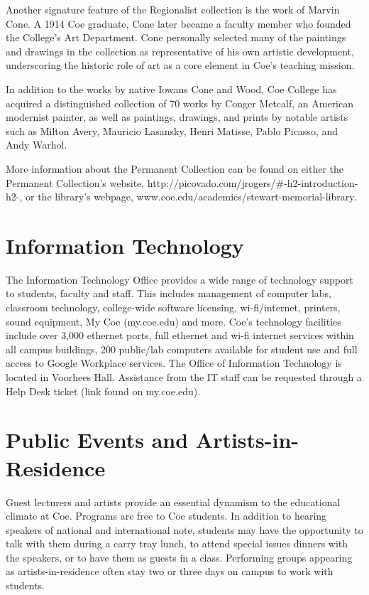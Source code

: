 \documentclass[
  letterpaper,
]{scrbook}
\begin{document}
Another signature feature of the Regionalist collection is the work of
Marvin Cone. A 1914 Coe graduate, Cone later became a faculty member who
founded the College's Art Department. Cone personally selected many of
the paintings and drawings in the collection as representative of his
own artistic development, underscoring the historic role of art as a
core element in Coe's teaching mission.

In addition to the works by native Iowans Cone and Wood, Coe College has
acquired a distinguished collection of 70 works by Conger Metcalf, an
American modernist painter, as well as paintings, drawings, and prints
by notable artists such as Milton Avery, Mauricio Lasansky, Henri
Matisse, Pablo Picasso, and Andy Warhol.

More information about the Permanent Collection can be found on either
the Permanent Collection's website,
http://picovado.com/jrogers/\#-h2-introduction-h2-, or the library's
webpage, www.coe.edu/academics/stewart-memorial-library.

\section{Information Technology}\label{information-technology}

The Information Technology Office provides a wide range of technology
support to students, faculty and staff. This includes management of
computer labs, classroom technology, college-wide software licensing,
wi-fi/internet, printers, sound equipment, My Coe (my.coe.edu) and more.
Coe's technology facilities include over 3,000 ethernet ports, full
ethernet and wi-fi internet services within all campus buildings, 200
public/lab computers available for student use and full access to Google
Workplace services. The Office of Information Technology is located in
Voorhees Hall. Assistance from the IT staff can be requested through a
Help Desk ticket (link found on my.coe.edu).

\section{Public Events and
Artists-in-Residence}\label{public-events-and-artists-in-residence}

Guest lecturers and artists provide an essential dynamism to the
educational climate at Coe. Programs are free to Coe students. In
addition to hearing speakers of national and international note,
students may have the opportunity to talk with them during a carry tray
lunch, to attend special issues dinners with the speakers, or to have
them as guests in a class. Performing groups appearing as
artists-in-residence often stay two or three days on campus to work with
students.
\end{document}
